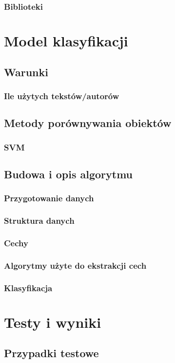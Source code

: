 \documentclass[a4paper,12pt,twoside,openany]{report}
\begin{document}
\subsection{Biblioteki}

\chapter{Model klasyfikacji}
\section{Warunki}
\subsection{Ile użytych tekstów/autorów}
\section{Metody porównywania obiektów}
\subsection{SVM}

\section{Budowa i opis algorytmu}
\subsection{Przygotowanie danych}
\subsection{Struktura danych}
\subsection{Cechy}
\subsection{Algorytmy użyte do ekstrakcji cech}
\subsection{Klasyfikacja}

\chapter{Testy i wyniki}
\section{Przypadki testowe}
\end{document}
